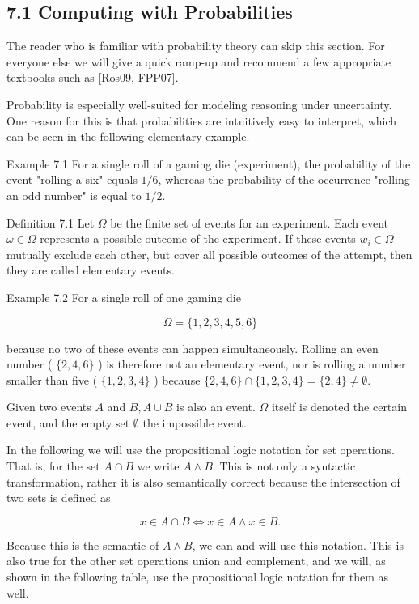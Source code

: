 \documentclass[10pt]{book}
\begin{document}
\begin{center}
\begin{enumerate}
\subsection*{7.1 Computing with Probabilities}
The reader who is familiar with probability theory can skip this section. For everyone else we will give a quick ramp-up and recommend a few appropriate textbooks such as [Ros09, FPP07].

Probability is especially well-suited for modeling reasoning under uncertainty. One reason for this is that probabilities are intuitively easy to interpret, which can be seen in the following elementary example.

Example 7.1 For a single roll of a gaming die (experiment), the probability of the event "rolling a six" equals $1 / 6$, whereas the probability of the occurrence "rolling an odd number" is equal to $1 / 2$.

Definition 7.1 Let $\Omega$ be the finite set of events for an experiment. Each event $\omega \in \Omega$ represents a possible outcome of the experiment. If these events $w_{i} \in \Omega$ mutually exclude each other, but cover all possible outcomes of the attempt, then they are called elementary events.

Example 7.2 For a single roll of one gaming die


$$
\Omega=\{1,2,3,4,5,6\}
$$

because no two of these events can happen simultaneously. Rolling an even number ( $\{2,4,6\}$ ) is therefore not an elementary event, nor is rolling a number smaller than five ( $\{1,2,3,4\}$ ) because $\{2,4,6\} \cap\{1,2,3,4\}=\{2,4\} \neq \emptyset$.

Given two events $A$ and $B, A \cup B$ is also an event. $\Omega$ itself is denoted the certain event, and the empty set $\emptyset$ the impossible event.

In the following we will use the propositional logic notation for set operations. That is, for the set $A \cap B$ we write $A \wedge B$. This is not only a syntactic transformation, rather it is also semantically correct because the intersection of two sets is defined as

$$
x \in A \cap B \Leftrightarrow x \in A \wedge x \in B .
$$

Because this is the semantic of $A \wedge B$, we can and will use this notation. This is also true for the other set operations union and complement, and we will, as shown in the following table, use the propositional logic notation for them as well.


\end{enumerate}
\end{center}
\end{document}
